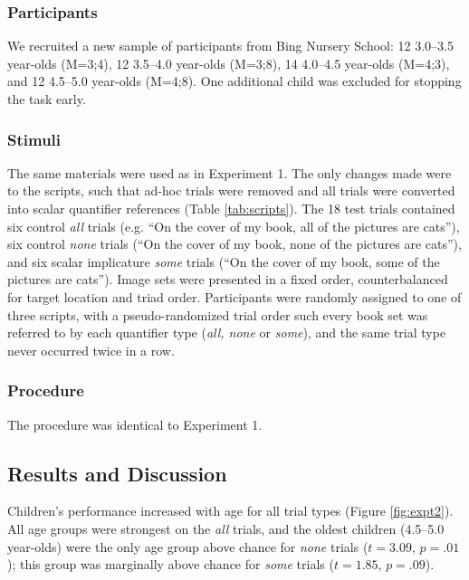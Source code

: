 \documentclass[10pt,letterpaper]{article}
\begin{document}
\subsubsection{Participants}

We recruited a new sample of participants from Bing Nursery School: 12 3.0--3.5 year-olds (M=3;4), 12 3.5--4.0 year-olds (M=3;8), 14 4.0--4.5 year-olds (M=4;3), and 12 4.5--5.0 year-olds (M=4;8).  One additional child was excluded for stopping the task early. 

\subsubsection{Stimuli}

The same materials were used as in Experiment 1. The only changes made were to the scripts, such that ad-hoc trials were removed and all trials were converted into scalar quantifier references (Table \ref{tab:scripts}).  The 18 test trials contained six control \emph{all} trials (e.g. ``On the cover of my book, all of the pictures are cats''), six control \emph{none} trials (``On the cover of my book, none of the pictures are cats''), and six scalar implicature \emph{some} trials (``On the cover of my book, some of the pictures are cats'').  Image sets were presented in a fixed order, counterbalanced for target location and triad order. Participants were randomly assigned to one of three scripts, with a pseudo-randomized trial order such every book set was referred to by each quantifier type (\emph{all, none} or \emph{some}), and the same trial type never occurred twice in a row.

\subsubsection{Procedure}

The procedure was identical to Experiment 1. 

\subsection{Results and Discussion}

Children's performance increased with age for all trial types (Figure \ref{fig:expt2}). All age groups were strongest on the \emph{all} trials, and the oldest children (4.5--5.0 year-olds) were the only age group above chance for \emph{none} trials ($t = 3.09$, $p=.01$); this group was marginally above chance for \emph{some} trials ($t=1.85$, $p=.09$). 
\end{document}
